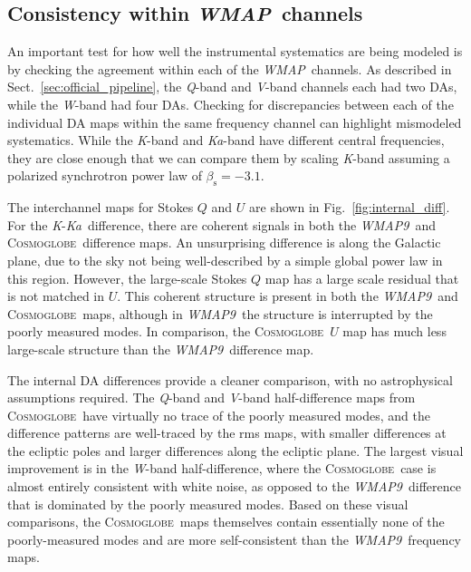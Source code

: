 \documentclass[twocolumn]{../../common/aa}
\def\WMAP{\emph{WMAP}}
\def\WMAPnine{\emph{WMAP9}}
\newcommand{\cosmoglobe}{\textsc{Cosmoglobe}}
\newcommand{\K}[0]{\textit K}
\newcommand{\Ka}[0]{\textit{Ka}}
\newcommand{\Q}[0]{\textit Q}
\newcommand{\V}[0]{\textit V}
\newcommand{\W}[0]{\textit W}
\begin{document}
\subsection{Consistency within \WMAP\ channels}
\label{sec:internal_consistency}

An important test for how well the instrumental systematics are being modeled is by checking the agreement within each of the \WMAP\ channels. As described in Sect.~\ref{sec:official_pipeline}, the \Q-band and \V-band channels each had two DAs, while the \W-band had four DAs. Checking for discrepancies between each of the individual DA maps within the same frequency channel can highlight mismodeled systematics. While the \K-band and \Ka-band have different central frequencies, they are close enough that we can compare them by scaling \K-band assuming a polarized synchrotron power law of $\beta_\mathrm s=-3.1$.

The interchannel maps for Stokes $Q$ and $U$ are shown in Fig.~\ref{fig:internal_diff}. 
For the \K-\Ka\ difference, there are coherent signals in both the \WMAPnine\ and \cosmoglobe\ difference maps. An unsurprising difference is along the Galactic plane, due to the sky not being well-described by a simple global power law in this region. However, the large-scale Stokes $Q$ map has a large scale residual that is not matched in $U$. This coherent structure is present in both the \WMAPnine\ and \cosmoglobe\ maps, although in \WMAPnine\ the structure is interrupted by the poorly measured modes. In comparison, the \cosmoglobe\ $U$ map has much less large-scale structure than the \WMAPnine\ difference map.

The internal DA differences provide a cleaner comparison, with no astrophysical assumptions required. The \Q-band and \V-band half-difference maps from \cosmoglobe\ have virtually no trace of the poorly measured modes, and the difference patterns are well-traced by the rms maps, with smaller differences at the ecliptic poles and larger differences along the ecliptic plane. The largest visual improvement is in the \W-band half-difference, where the \cosmoglobe\ case is almost entirely consistent with white noise, as opposed to the \WMAPnine\ difference that is dominated by the poorly measured modes.  Based on these visual comparisons, the \cosmoglobe\ maps themselves contain essentially none of the poorly-measured modes and are more self-consistent than the \WMAPnine\ frequency maps.
\end{document}

